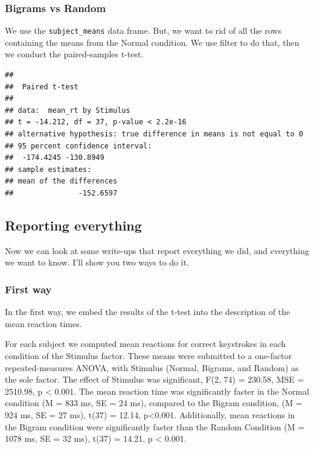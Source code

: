 \documentclass[]{book}
\newenvironment{Shaded}{\begin{snugshade}}{\end{snugshade}}
\newcommand{\KeywordTok}[1]{\textcolor[rgb]{0.13,0.29,0.53}{\textbf{{#1}}}}
\newcommand{\DataTypeTok}[1]{\textcolor[rgb]{0.13,0.29,0.53}{{#1}}}
\newcommand{\StringTok}[1]{\textcolor[rgb]{0.31,0.60,0.02}{{#1}}}
\newcommand{\OtherTok}[1]{\textcolor[rgb]{0.56,0.35,0.01}{{#1}}}
\newcommand{\NormalTok}[1]{{#1}}
\theoremstyle{definition}
\theoremstyle{definition}
\theoremstyle{definition}
\theoremstyle{remark}
\begin{document}
\subsubsection{Bigrams vs Random}\label{bigrams-vs-random}

We use the \texttt{subject\_means} data frame. But, we want to rid of
all the rows containing the means from the Normal condition. We use
filter to do that, then we conduct the paired-samples t-test.

\begin{Shaded}
\end{Shaded}

\begin{verbatim}
## 
##  Paired t-test
## 
## data:  mean_rt by Stimulus
## t = -14.212, df = 37, p-value < 2.2e-16
## alternative hypothesis: true difference in means is not equal to 0
## 95 percent confidence interval:
##  -174.4245 -130.8949
## sample estimates:
## mean of the differences 
##               -152.6597
\end{verbatim}

\subsection{Reporting everything}\label{reporting-everything}

Now we can look at some write-ups that report everything we did, and
everything we want to know. I'll show you two ways to do it.

\subsubsection{First way}\label{first-way}

In the first way, we embed the results of the t-test into the
description of the mean reaction times.

For each subject we computed mean reactions for correct keystrokes in
each condition of the Stimulus factor. These means were submitted to a
one-factor repeated-measures ANOVA, with Stimulus (Normal, Bigrams, and
Random) as the sole factor. The effect of Stimulus was significant, F(2,
74) = 230.58, MSE = 2510.98, p \textless{} 0.001. The mean reaction time
was significantly faster in the Normal condition (M = 833 ms, SE = 24
ms), compared to the Bigram condition, (M = 924 ms, SE = 27 ms), t(37) =
12.14, p\textless{}0.001. Additionally, mean reactions in the Bigram
condition were significantly faster than the Random Condition (M = 1078
ms, SE = 32 ms), t(37) = 14.21, p \textless{} 0.001.
\end{document}
